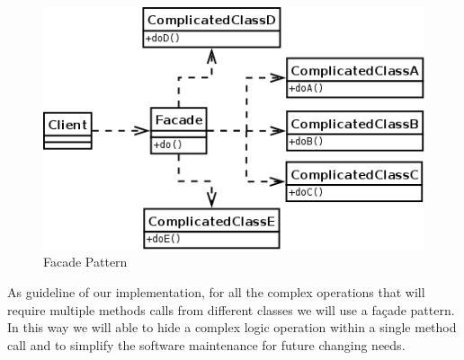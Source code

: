 \begin{figure}[H]
	\centering
	\includegraphics[scale=0.3]{Images/Patterns/Facade_Pattern}
	\caption{Facade Pattern}
\end{figure}
As guideline of our implementation, for all the complex operations that will require multiple methods calls from different classes we will use a façade pattern. In this way we will able to hide a complex logic operation within a single method call and to simplify the software maintenance for future changing needs.
